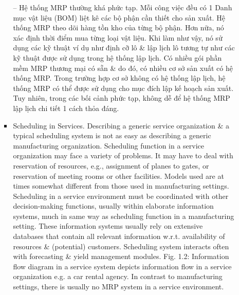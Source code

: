 \documentclass{article}
\begin{document}
\begin{itemize}
\begin{itemize}
\begin{itemize}
            -- Hệ thống MRP thường khá phức tạp. Mỗi công việc đều có 1 Danh mục vật liệu (BOM) liệt kê các bộ phận cần thiết cho sản xuất. Hệ thống MRP theo dõi hàng tồn kho của từng bộ phận. Hơn nữa, nó xác định thời điểm mua từng loại vật liệu. Khi làm như vậy, nó sử dụng các kỹ thuật ví dụ như định cỡ lô \& lập lịch lô tương tự như các kỹ thuật được sử dụng trong hệ thống lập lịch. Có nhiều gói phần mềm MRP thương mại có sẵn \& do đó, có nhiều cơ sở sản xuất có hệ thống MRP. Trong trường hợp cơ sở không có hệ thống lập lịch, hệ thống MRP có thể được sử dụng cho mục đích lập kế hoạch sản xuất. Tuy nhiên, trong các bối cảnh phức tạp, không dễ để hệ thống MRP lập lịch chi tiết 1 cách thỏa đáng.
            \item {\sf Scheduling in Services.} Describing a generic service organization \& a typical scheduling system is not as easy as describing a generic manufacturing organization. Scheduling function in a service organization may face a variety of problems. It may have to deal with reservation of resources, e.g., assignment of planes to gates, or reservation of meeting rooms or other facilities. Models used are at times somewhat different from those used in manufacturing settings. Scheduling in a service environment must be coordinated with other decision-making functions, usually within elaborate information systems, much in same way as scheduling function in a manufacturing setting. These information systems usually rely on extensive databases that contain all relevant information w.r.t. availability of resources \& (potential) customers. Scheduling system interacts often with forecasting \& yield management modules. {\sf Fig. 1.2: Information flow diagram in a service system} depicts information flow in a service organization e.g. a car rental agency. In contrast to manufacturing settings, there is usually no MRP system in a service environment.


\end{itemize}
\end{itemize}
\end{itemize}
\end{document}
